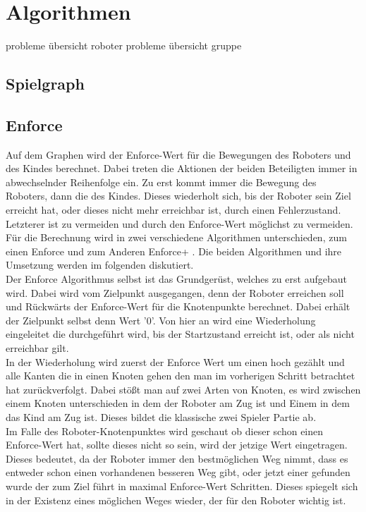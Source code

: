 \section{Algorithmen}
probleme übersicht roboter
probleme übersicht gruppe
\subsection{Spielgraph}
\subsection{Enforce}
Auf dem Graphen wird der Enforce-Wert für die Bewegungen des Roboters und des Kindes berechnet. Dabei treten die Aktionen der beiden Beteiligten immer in abwechselnder Reihenfolge ein. Zu erst kommt immer die Bewegung des Roboters, dann die des Kindes. Dieses wiederholt sich, bis der Roboter sein Ziel erreicht hat, oder dieses nicht mehr erreichbar ist, durch einen Fehlerzustand. Letzterer ist zu vermeiden und durch den Enforce-Wert möglichst zu vermeiden. \\
Für die Berechnung wird in zwei verschiedene Algorithmen unterschieden, zum einen Enforce und zum Anderen Enforce+ . Die beiden Algorithmen und ihre Umsetzung werden im folgenden diskutiert. \\
Der Enforce Algorithmus selbst ist das Grundgerüst, welches zu erst aufgebaut wird. Dabei wird vom Zielpunkt ausgegangen, denn der Roboter erreichen soll und Rückwärts der Enforce-Wert für die Knotenpunkte berechnet. Dabei erhält der Zielpunkt selbst denn Wert '0'. Von hier an wird eine Wiederholung eingeleitet die durchgeführt wird, bis der Startzustand erreicht ist, oder als nicht erreichbar gilt. \\
In der Wiederholung wird zuerst der Enforce Wert um einen hoch gezählt und alle Kanten die in einen Knoten gehen den man im vorherigen Schritt betrachtet hat zurückverfolgt. Dabei stößt man auf zwei Arten von Knoten, es wird zwischen einem Knoten unterschieden in dem der Roboter am Zug ist und Einem in dem das Kind am Zug ist. Dieses bildet die klassische zwei Spieler Partie ab. \\
Im Falle des Roboter-Knotenpunktes wird geschaut ob dieser schon einen Enforce-Wert hat, sollte dieses nicht so sein, wird der jetzige Wert eingetragen. Dieses bedeutet, da der Roboter immer den bestmöglichen Weg nimmt, dass es entweder schon einen vorhandenen besseren Weg gibt, oder jetzt einer gefunden wurde der zum Ziel führt in maximal Enforce-Wert Schritten. Dieses spiegelt sich in der Existenz eines möglichen Weges wieder, der für den Roboter wichtig ist. \\
